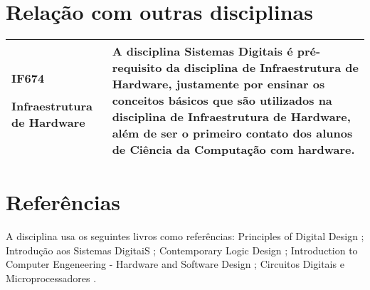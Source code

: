 \documentclass[10pt]{article}
\begin{document}
\section{Relação com outras disciplinas}
\begin{table}[h]
 \centering
 {\renewcommand\arraystretch{1.25}
 \begin{tabular}{ l l }
  \cline{1-1}\cline{2-2}  
    \multicolumn{1}{|p{5cm}|}{\begin{center}IF674
\end{center}  			


\begin{center}Infraestrutura de Hardware
\end{center}} &
    \multicolumn{1}{p{5cm}|}{ A disciplina Sistemas Digitais é pré-requisito da disciplina de Infraestrutura de Hardware, justamente por ensinar os conceitos básicos que são utilizados na disciplina de Infraestrutura de Hardware, além de ser o primeiro contato dos alunos de Ciência da Computação com hardware. }
  \\  
  \hline

 \end{tabular} }
\end{table}
\section{Referências}
A disciplina usa os seguintes livros como referências: Principles of Digital Design \cite{livro1}; Introdução aos Sistemas DigitaiS \cite{livro2}; Contemporary Logic Design \cite{livro3} ;  Introduction to Computer Engeneering - Hardware and Software Design \cite{livro4}; Circuitos Digitais e Microprocessadores \cite{livro5}.



\end{document}
